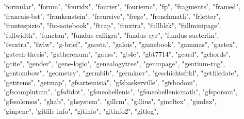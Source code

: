 \documentclass[
]{article}
\newenvironment{Shaded}{\begin{snugshade}}{\end{snugshade}}
\newcommand{\NormalTok}[1]{#1}
\newcommand{\StringTok}[1]{\textcolor[rgb]{0.31,0.60,0.02}{#1}}
\begin{document}
\begin{Shaded}
\begin{Highlighting}[]
\StringTok{"formular"}\NormalTok{, }\StringTok{"forum"}\NormalTok{, }\StringTok{"fouridx"}\NormalTok{, }\StringTok{"fourier"}\NormalTok{, }\StringTok{"fouriernc"}\NormalTok{, }\StringTok{"fp"}\NormalTok{, }
\StringTok{"fragments"}\NormalTok{, }\StringTok{"framed"}\NormalTok{, }\StringTok{"francais{-}bst"}\NormalTok{, }\StringTok{"frankenstein"}\NormalTok{, }\StringTok{"frcursive"}\NormalTok{, }
\StringTok{"frege"}\NormalTok{, }\StringTok{"frenchmath"}\NormalTok{, }\StringTok{"frletter"}\NormalTok{, }\StringTok{"frontespizio"}\NormalTok{, }\StringTok{"ftc{-}notebook"}\NormalTok{, }
\StringTok{"ftcap"}\NormalTok{, }\StringTok{"ftnxtra"}\NormalTok{, }\StringTok{"fullblck"}\NormalTok{, }\StringTok{"fullminipage"}\NormalTok{, }\StringTok{"fullwidth"}\NormalTok{, }
\StringTok{"functan"}\NormalTok{, }\StringTok{"fundus{-}calligra"}\NormalTok{, }\StringTok{"fundus{-}cyr"}\NormalTok{, }\StringTok{"fundus{-}sueterlin"}\NormalTok{, }
\StringTok{"fvextra"}\NormalTok{, }\StringTok{"fwlw"}\NormalTok{, }\StringTok{"g{-}brief"}\NormalTok{, }\StringTok{"gaceta"}\NormalTok{, }\StringTok{"galois"}\NormalTok{, }\StringTok{"gamebook"}\NormalTok{, }
\StringTok{"gammas"}\NormalTok{, }\StringTok{"gastex"}\NormalTok{, }\StringTok{"gatech{-}thesis"}\NormalTok{, }\StringTok{"gatherenum"}\NormalTok{, }\StringTok{"gauss"}\NormalTok{, }\StringTok{"gb4e"}\NormalTok{, }
\StringTok{"gbt7714"}\NormalTok{, }\StringTok{"gcard"}\NormalTok{, }\StringTok{"gchords"}\NormalTok{, }\StringTok{"gcite"}\NormalTok{, }\StringTok{"gender"}\NormalTok{, }\StringTok{"gene{-}logic"}\NormalTok{, }
\StringTok{"genealogytree"}\NormalTok{, }\StringTok{"genmpage"}\NormalTok{, }\StringTok{"gentium{-}tug"}\NormalTok{, }\StringTok{"gentombow"}\NormalTok{, }\StringTok{"geometry"}\NormalTok{, }
\StringTok{"germbib"}\NormalTok{, }\StringTok{"germkorr"}\NormalTok{, }\StringTok{"geschichtsfrkl"}\NormalTok{, }\StringTok{"getfiledate"}\NormalTok{, }\StringTok{"getitems"}\NormalTok{, }
\StringTok{"getmap"}\NormalTok{, }\StringTok{"gfsartemisia"}\NormalTok{, }\StringTok{"gfsbaskerville"}\NormalTok{, }\StringTok{"gfsbodoni"}\NormalTok{, }\StringTok{"gfscomplutum"}\NormalTok{, }
\StringTok{"gfsdidot"}\NormalTok{, }\StringTok{"gfsneohellenic"}\NormalTok{, }\StringTok{"gfsneohellenicmath"}\NormalTok{, }\StringTok{"gfsporson"}\NormalTok{, }
\StringTok{"gfssolomos"}\NormalTok{, }\StringTok{"ghab"}\NormalTok{, }\StringTok{"ghsystem"}\NormalTok{, }\StringTok{"gillcm"}\NormalTok{, }\StringTok{"gillius"}\NormalTok{, }\StringTok{"gincltex"}\NormalTok{, }
\StringTok{"gindex"}\NormalTok{, }\StringTok{"ginpenc"}\NormalTok{, }\StringTok{"gitfile{-}info"}\NormalTok{, }\StringTok{"gitinfo"}\NormalTok{, }\StringTok{"gitinfo2"}\NormalTok{, }\StringTok{"gitlog"}\NormalTok{, }

\end{Highlighting}
\end{Shaded}
\end{document}
